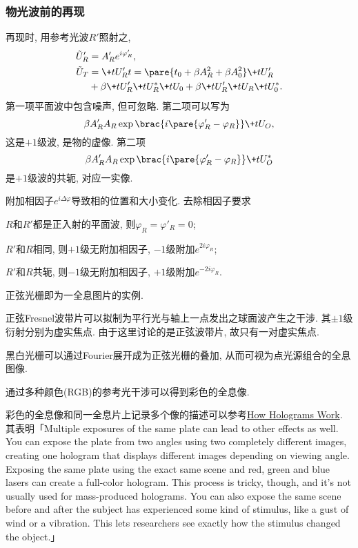 \documentclass{ctexart}
\def\externallinksymbol{\raisebox{-.2\height}{\texttt{[image: externallink.eps]}}}
\let\oldhref\href
\def\href{\externallinksymbol\oldhref}
\begin{document}

\subsubsection{物光波前的再现} %
\label{ssub:物光波前的再现}

再现时, 用参考光波$R'$照射之,
\begin{align*}
    \tilde{U}_R' &= A_R' e^{i\varphi_R'}, \\
    \tilde{U}_T &= \+tU_R't = \pare{t_0 + \beta A_R^2 + \beta A_0^2} \+tU_R' \\
    &+ \beta \+tU_R' \+tU_R^* \+tU_0 + \beta \+tU_R' \+tU_R \+tU_0^*.
\end{align*}
第一项平面波中包含噪声, 但可忽略. 第二项可以写为
\[  \beta A'_RA_R \exp\brac{i\pare{\varphi'_R - \varphi_R}}\+tU_O, \]
这是$+1$级波, 是物的虚像. 第二项
\[  \beta A'_RA_R \exp\brac{i\pare{\varphi'_R - \varphi_R}}\+tU_O^* \]
是$+1$级波的共轭, 对应一实像.
\par
附加相因子$e^{i\Delta\varphi}$导致相的位置和大小变化. 去除相因子要求
\begin{cenum}
    \item $R$和$R'$都是正入射的平面波, 则$\varphi_R = \varphi'_R = 0$;
    \item $R'$和$R$相同, 则$+1$级无附加相因子, $-1$级附加$e^{2i\varphi_R}$;
    \item $R'$和$R$共轭, 则$-1$级无附加相因子, $+1$级附加$e^{-2i\varphi_R}$.
\end{cenum}
\begin{remark}
    正弦光栅即为一全息图片的实例.
\end{remark}
\begin{remark}
    正弦Fresnel波带片可以拟制为平行光与轴上一点发出之球面波产生之干涉. 其$\pm 1$级衍射分别为虚实焦点. 由于这里讨论的是正弦波带片, 故只有一对虚实焦点.
\end{remark}
\begin{remark}
    黑白光栅可以通过Fourier展开成为正弦光栅的叠加, 从而可视为点光源组合的全息图像.
\end{remark}
通过多种颜色(RGB)的参考光干涉可以得到彩色的全息像.
\begin{remark}
    彩色的全息像和同一全息片上记录多个像的描述可以参考\href{https://science.howstuffworks.com/hologram11.htm}{How Holograms Work}. 其表明「Multiple exposures of the same plate can lead to other effects as well. You can expose the plate from two angles using two completely different images, creating one hologram that displays different images depending on viewing angle. Exposing the same plate using the exact same scene and red, green and blue lasers can create a full-color hologram. This process is tricky, though, and it's not usually used for mass-produced holograms. You can also expose the same scene before and after the subject has experienced some kind of stimulus, like a gust of wind or a vibration. This lets researchers see exactly how the stimulus changed the object.」
\end{remark}
\end{document}
